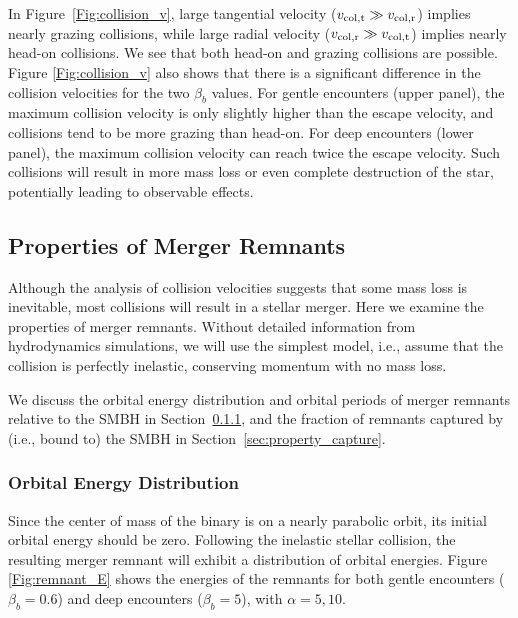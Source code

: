 \documentclass[twocolumn]{aastex631}
\begin{document}
In Figure~\ref{Fig:collision_v}, large tangential velocity ($v_{\rm col,t} \gg v_{\rm col,r}$) implies nearly grazing collisions, while large radial velocity ($v_{\rm col,r} \gg v_{\rm col,t}$) implies nearly head-on collisions. 
We see that both head-on and grazing collisions are possible.
Figure \ref{Fig:collision_v} also shows that there is a significant difference in the collision velocities for the two $\beta_b$ values.
For gentle encounters (upper panel), the maximum collision velocity is only slightly higher than the escape velocity, and collisions tend to be more grazing than head-on.
For deep encounters (lower panel), the maximum collision velocity can reach twice the escape velocity. 
Such collisions will result in more mass loss or even complete destruction of the star, potentially leading to observable effects.


\subsection{Properties of Merger Remnants}
\label{sec:properties of merger remnant}

Although the analysis of collision velocities suggests that some mass loss is inevitable, most collisions will result in a stellar merger. 
Here we examine the properties of merger remnants. 
Without detailed information from hydrodynamics simulations, we will use the simplest model, i.e., assume that the collision is perfectly inelastic, conserving momentum with no mass loss. 

We discuss the orbital energy distribution and
orbital periods of merger remnants relative to the SMBH in Section~\ref{sec:property_energy},
and the fraction of remnants captured by (i.e., bound to) the SMBH in Section~\ref{sec:property_capture}.


\subsubsection{Orbital Energy Distribution}
\label{sec:property_energy}

Since the center of mass of the binary is on a nearly parabolic orbit, its initial orbital energy should be zero. 
Following the inelastic stellar collision, the resulting merger remnant will exhibit a distribution of orbital energies.
Figure \ref{Fig:remnant_E} shows the energies of the remnants for both gentle encounters ($\beta_b = 0.6$) and deep encounters ($\beta_b = 5$), with $\alpha = 5, 10$.
\end{document}
